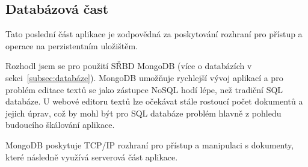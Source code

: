 \subsection{Databázová čast}\label{subsec:databázováČast}

Tato poslední část aplikace je zodpovědná za poskytování rozhraní pro přístup a operace na perzistentním uložištěm.

Rozhodl jsem se pro použití \gls{SŘBD} MongoDB (více o databázích v sekci~\ref{subsec:databáze}).
MongoDB umožňuje rychlejší vývoj aplikací a pro problém editace textů se jako zástupce \gls{NoSQL} hodí lépe, než tradiční \gls{SQL} databáze.
U webové editoru textů lze očekávat stále rostoucí počet dokumentů a jejich úprav, což by mohl být pro \gls{SQL} databáze problém hlavně z pohledu budoucího škálování aplikace.

MongoDB poskytuje \gls{TCP/IP} rozhraní pro přístup a manipulaci s dokumenty, které následně využívá serverová část aplikace.

